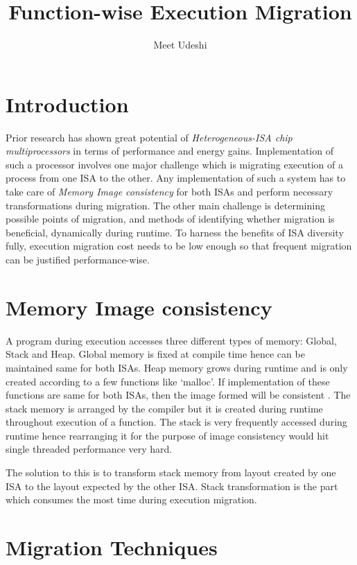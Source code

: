 \documentclass[a4paper]{article}
\title{Function-wise Execution Migration}
\author{Meet Udeshi}
\begin{document}
\maketitle

\section{Introduction}

Prior research has shown great potential of \textit{Heterogeneous-ISA chip multiprocessors} in terms of performance and energy gains. Implementation of such a processor involves one major challenge which is migrating execution of a process from one ISA to the other. Any implementation of such a system has to take care of \textit{Memory Image consistency} for both ISAs and perform necessary transformations during migration. The other main challenge is determining possible points of migration, and methods of identifying whether migration is beneficial, dynamically during runtime. To harness the benefits of ISA diversity fully, execution migration cost needs to be low enough so that frequent migration can be justified performance-wise.

\section{Memory Image consistency}

A program during execution accesses three different types of memory: Global, Stack and Heap.
Global memory is fixed at compile time hence can be maintained same for both ISAs. Heap memory grows during runtime and is only created according to a few functions like `malloc'. If implementation of these functions are same for both ISAs, then the image formed will be consistent \cite{execution-migration}. The stack memory is arranged by the compiler but it is created during runtime throughout execution of a function. The stack is very frequently accessed during runtime hence rearranging it for the purpose of image consistency would hit single threaded performance very hard.

The solution to this is to transform stack memory from layout created by one ISA to the layout expected by the other ISA. Stack transformation is the part which consumes the most time during execution migration.

\section{Migration Techniques}
\end{document}
